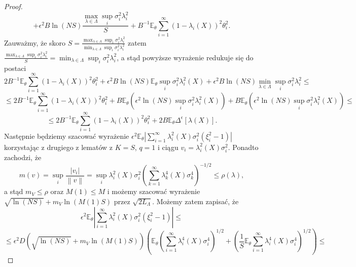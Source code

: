 \documentclass{article}
\newcommand{\norm}[1]{\left\lVert#1\right\rVert}
\begin{document}
\begin{proof}
\begin{displaymath}
+\epsilon^2B\ln (NS)\frac{\max_{\lambda\in \Lambda}\sup_i\sigma_i^2\lambda_i^2}{S}+B^{-1}\mathbb{E}_{\theta}\sum_{i=1}^{\infty}(1-\lambda_i(X))^2\theta_i^2.
\end{displaymath}
Zauważmy, że skoro $S=\frac{\max_{\lambda\in \Lambda}\sup_i\sigma_i^2\lambda_i^2}{\min_{\lambda\in \Lambda}\sup_i\sigma_i^2\lambda_i^2}$ zatem $\frac{\max_{\lambda\in \Lambda}\sup_i\sigma_i^2\lambda_i^2}{S}=\min_{\lambda\in \Lambda}\sup_i\sigma_i^2\lambda_i^2$, a stąd powyższe wyrażenie redukuje się do postaci
\begin{displaymath}
2B^{-1}\mathbb{E}_{\theta}\sum_{i=1}^{\infty}(1-\lambda_i(X))^2\theta_i^2+\epsilon^2B\ln (NS)\mathbb{E}_{\theta}\sup_i\sigma_i^2\lambda_i^2(X)+\epsilon^2B\ln (NS)\min_{\lambda\in \Lambda}\sup_i\sigma_i^2\lambda_i^2\leq
\end{displaymath}
\begin{displaymath}
\leq 2B^{-1}\mathbb{E}_{\theta}\sum_{i=1}^{\infty}(1-\lambda_i(X))^2\theta_i^2+B\mathbb{E}_{\theta}\left(\epsilon^2\ln (NS)\sup_i\sigma_i^2\lambda_i^2(X)\right)+B\mathbb{E}_{\theta}\left(\epsilon^2\ln (NS)\sup_i\sigma_i^2\lambda_i^2(X)\right)\leq
\end{displaymath}
\begin{displaymath}
\leq 2B^{-1}\mathbb{E}_{\theta}\sum_{i=1}^{\infty}(1-\lambda_i(X))^2\theta_i^2+2B\mathbb{E}_{\theta}\Delta^{\epsilon}[\lambda(X)].
\end{displaymath}
Następnie będziemy szacować wyrażenie $\epsilon^2\mathbb{E}_{\theta}\left|\sum_{i=1}^{\infty}\lambda_i^2(X)\sigma_i^2(\xi^2_i-1)\right|$ korzystając z drugiego z lematów z $K=S$, $q=1$ i ciągu $v_i=\lambda_i^2(X)\sigma_i^2$. Ponadto zachodzi, że 
\begin{displaymath}
m(v)=\sup_i\frac{|v_i|}{\norm{v}}=\sup_i\lambda_i^2(X)\sigma_i^2\left(\sum_{k=1}^{\infty}\lambda_k^4(X)\sigma_k^4\right)^{-1/2}\leq \rho (\lambda),
\end{displaymath}
a stąd $m_V\leq \rho$ oraz $M(1)\leq M$ i możemy szacować wyrażenie $\sqrt{\ln (NS)}+m_V\ln (M(1)S)$ przez $\sqrt{2L_{\Lambda}}$. Możemy zatem zapisać, że
\begin{displaymath}
\epsilon^2\mathbb{E}_{\theta}\left|\sum_{i=1}^{\infty}\lambda_i^2(X)\sigma_i^2(\xi^2_i-1)\right|\leq
\end{displaymath}
\begin{displaymath}
\leq \epsilon^2D\left(\sqrt{\ln (NS)}+m_V\ln (M(1)S)\right)\left(\mathbb{E}_{\theta}\left(\sum_{i=1}^{\infty}\lambda_i^4(X)\sigma_i^4\right)^{1/2}+\left(\frac{1}{S}\mathbb{E}_{\theta}\sum_{i=1}^{\infty}\lambda_i^4(X)\sigma_i^4\right)^{1/2}\right)\leq

\end{displaymath}
\end{proof}
\end{document}
